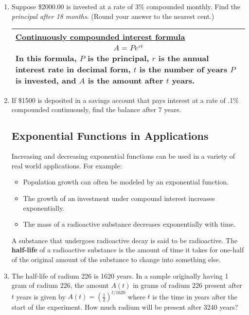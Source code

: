 \begin{enumerate}
\item Suppose \$2000.00 is invested at a rate of $3 \%$ compounded
  monthly. Find the \emph{principal after 18 months}. (Round your
  answer to the nearest cent.)

  \vfill


  \hspace{-.3in}
  \begin{tabular}{| p{} |} \hline
    \underline{Continuously compounded interest formula}
    \begin{eqnarray*}
      A = Pe^{rt}
    \end{eqnarray*}
    In this formula, $P$ is the principal, $r$ is the annual interest rate in decimal form, 
    $t$ is the number of years $P$ is invested, and
    $A$ is the amount after $t$ years.   \\ \hline
\end{tabular}


\item If \$1500 is deposited in a savings account that pays interest
  at a rate of .1\% compounded continuously, find the balance after 7
  years.

  \vfill


\newpage

\subsection{Exponential Functions in Applications} 
Increasing and decreasing exponential functions can be used in a
variety of real world applications.  For example:
\begin{itemize}
\item Population growth can often be modeled by an exponential function.
\item The growth of an investment under compound interest increases exponentially.
\item The mass of a radioactive substance decreases exponentially with time.
\end{itemize}

\noindent A substance that undergoes radioactive decay is said to be radioactive.  The \textbf{half-life} of a radioactive substance is the amount of time it takes for one-half of the original amount of the substance to change into something else.

\item The half-life of radium 226 is 1620 years.  In a sample originally having 1 gram of radium 226, the amount $A(t)$ in grams of radium 226 present after $t$ years is given by $\displaystyle A(t)=(\frac{1}{2})^{t/1620}$ where $t$ is the time in years after the start of the experiment.  How much radium will be present after 3240 years? 
\vfill


\end{enumerate}

